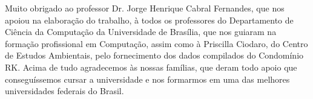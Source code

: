 Muito obrigado ao professor Dr. Jorge Henrique Cabral Fernandes, que nos apoiou na elaboração do trabalho, à todos os professores do Departamento de Ciência da Computação da Universidade de Brasília, que nos guiaram na formação profissional em Computação, assim como à Priscilla Ciodaro, do Centro de Estudos Ambientais, pelo fornecimento dos dados compilados do Condomínio RK. 
Acima de tudo agradecemos às nossas famílias, que deram todo apoio que conseguíssemos cursar a universidade e nos formarmos em uma das melhores universidades federais do Brasil. 